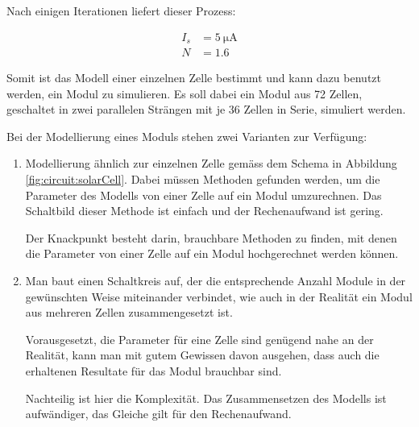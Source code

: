 Nach einigen Iterationen liefert dieser Prozess\footnotemark:


\begin{align}
    \label{eq:cell:diode:IS:N:result}
    I_s &= \SI{5}{\micro\ampere} \\
    N   &= 1.6
\end{align}

Somit ist  das Modell  einer einzelnen  Zelle bestimmt  und kann  dazu benutzt
werden,  ein Modul  zu  simulieren. Es soll  dabei ein  Modul  aus 72  Zellen,
geschaltet in zwei parallelen Str\"angen mit  je 36 Zellen in Serie, simuliert
werden.

\myfancybreak

Bei der Modellierung eines Moduls stehen zwei Varianten zur Verf\"ugung:

\begin{enumerate}
    \item
        Modellierung  \"ahnlich  zur  einzelnen   Zelle  gem\"ass  dem  Schema
        in  Abbildung   \ref{fig:circuit:solarCell}. Dabei  m\"ussen  Methoden
        gefunden werden, um die Parameter des  Modells von einer Zelle auf ein
        Modul umzurechnen.  Das Schaltbild dieser  Methode ist einfach und der
        Rechenaufwand ist gering.

        Der Knackpunkt besteht darin, brauchbare Methoden zu finden, mit denen
        die  Parameter von  einer  Zelle auf  ein  Modul hochgerechnet  werden
        k\"onnen.
    \item
        Man baut einen Schaltkreis auf, der die entsprechende Anzahl Module in
        der  gew\"unschten  Weise  miteinander  verbindet,  wie  auch  in  der
        Realit\"at ein Modul aus mehreren Zellen zusammengesetzt ist.

        Vorausgesetzt, die Parameter f\"ur eine  Zelle sind gen\"ugend nahe an
        der Realit\"at, kann man mit  gutem Gewissen davon ausgehen, dass auch
        die erhaltenen Resultate f\"ur das Modul brauchbar sind.

        Nachteilig ist hier die  Komplexit\"at. Das Zusammensetzen des Modells
        ist aufw\"andiger, das Gleiche gilt f\"ur den Rechenaufwand.
\end{enumerate}

